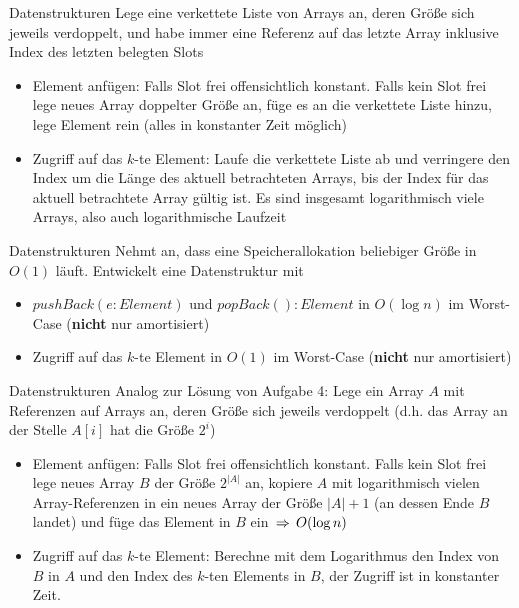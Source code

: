 \begin{frame}{Datenstrukturen} %
	\solutionheading
	Lege eine verkettete Liste von Arrays an, deren Größe sich jeweils verdoppelt, und habe immer eine Referenz auf das letzte Array inklusive Index des letzten belegten Slots
	\pause
	\begin{itemize}
		\item Element anfügen: Falls Slot frei \impl offensichtlich konstant. Falls kein Slot frei \impl lege neues Array doppelter Größe an, füge es an die verkettete Liste hinzu, lege Element rein (alles in konstanter Zeit möglich)
		\pause
		\item Zugriff auf das $k$-te Element: Laufe die verkettete Liste ab und verringere den Index um die Länge des aktuell betrachteten Arrays, bis der Index für das aktuell betrachtete Array gültig ist. Es sind insgesamt logarithmisch viele Arrays, also auch logarithmische Laufzeit
	\end{itemize}
\end{frame}



\begin{frame}{Datenstrukturen}
	Nehmt an, dass eine Speicherallokation beliebiger Größe in $O(1)$ läuft. Entwickelt eine Datenstruktur mit
	\begin{itemize}
		\item $pushBack(e : Element)$ und $popBack() : Element$ in $O(\log n)$ im Worst-Case (\textbf{nicht} nur amortisiert)
		\item Zugriff auf das $k$-te Element in $O(1)$ im Worst-Case (\textbf{nicht} nur amortisiert)
	\end{itemize}
\end{frame}

\begin{frame}{Datenstrukturen} %
	\solutionheading
	Analog zur Lösung von Aufgabe 4: Lege ein Array $A$ mit Referenzen auf Arrays an, deren Größe sich jeweils verdoppelt (d.h. das Array an der Stelle $A[i]$ hat die Größe $2^i$)
	\pause
	\begin{itemize}
		\item Element anfügen: Falls Slot frei \impl offensichtlich konstant. Falls kein Slot frei \impl lege neues Array $B$ der Größe $2^{|A|}$ an, kopiere $A$ mit logarithmisch vielen Array-Referenzen in ein neues Array der Größe $|A|+1$ (an dessen Ende $B$ landet) und füge das Element in $B$ ein $\impl O(\log n)$
		\pause
		\item Zugriff auf das $k$-te Element: Berechne mit dem Logarithmus den Index von $B$ in $A$ und den Index des $k$-ten Elements in $B$, der Zugriff ist in konstanter Zeit.
	\end{itemize}
\end{frame}



